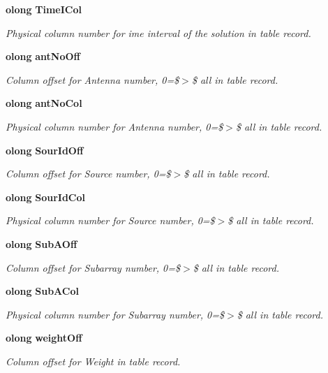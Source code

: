 \begin{CompactItemize}
{\bf olong} {\bf Time\-ICol}
\begin{CompactList}\small\item\em Physical column number for ime interval of the solution in table record. \item\end{CompactList}\item 
{\bf olong} {\bf ant\-No\-Off}
\begin{CompactList}\small\item\em Column offset for Antenna number, 0=\$$>$\$ all in table record. \item\end{CompactList}\item 
{\bf olong} {\bf ant\-No\-Col}
\begin{CompactList}\small\item\em Physical column number for Antenna number, 0=\$$>$\$ all in table record. \item\end{CompactList}\item 
{\bf olong} {\bf Sour\-Id\-Off}
\begin{CompactList}\small\item\em Column offset for Source number, 0=\$$>$\$ all in table record. \item\end{CompactList}\item 
{\bf olong} {\bf Sour\-Id\-Col}
\begin{CompactList}\small\item\em Physical column number for Source number, 0=\$$>$\$ all in table record. \item\end{CompactList}\item 
{\bf olong} {\bf Sub\-AOff}
\begin{CompactList}\small\item\em Column offset for Subarray number, 0=\$$>$\$ all in table record. \item\end{CompactList}\item 
{\bf olong} {\bf Sub\-ACol}
\begin{CompactList}\small\item\em Physical column number for Subarray number, 0=\$$>$\$ all in table record. \item\end{CompactList}\item 
{\bf olong} {\bf weight\-Off}
\begin{CompactList}\small\item\em Column offset for Weight in table record. \item\end{CompactList}\item 

\end{CompactItemize}
